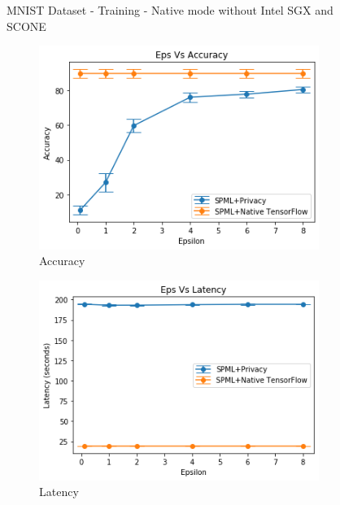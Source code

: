 \begin{figure}
        \caption{MNIST Dataset - Training - Native mode without Intel SGX and SCONE}
     \begin{subfigure}{0.5\textwidth}
         \includegraphics[width=\textwidth]{images/Training/MnistSimAccuracy.png}
         \caption{Accuracy}
         \label{fig:simMnistAccuracyTraining}
     \end{subfigure}
     \begin{subfigure}{0.5\textwidth}
         \includegraphics[width=\textwidth]{images/Training/MnistSimLatency.png}
         \caption{Latency}
         \label{fig:simMnistLatencyTraining}
     \end{subfigure}
        \caption{MNIST Dataset - Training - Simulation mode without Intel SGX and with SCONE}
     \begin{subfigure}{0.5\textwidth}

\end{subfigure}
\end{figure}
